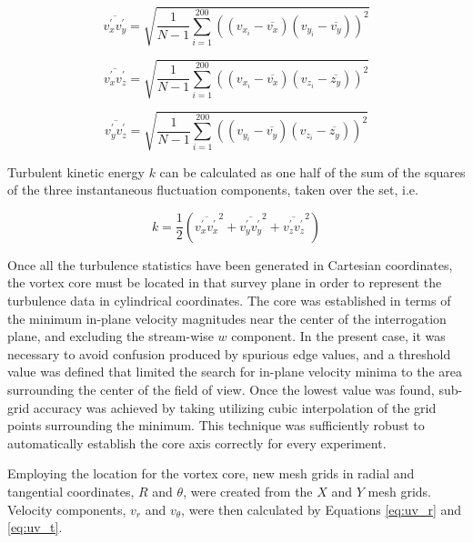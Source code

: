 \begin{equation}
\overline{v_x^\prime v_y^\prime} = \sqrt{\frac{1}{N-1} \sum_{i=1}^{200} 
	((v_{x_i} - \overline{v_x})(v_{y_i} - \overline{v_y}))^2}
\end{equation}

\begin{equation}
\overline{v_x^\prime v_z^\prime} = \sqrt{\frac{1}{N-1} \sum_{i=1}^{200} 
	((v_{x_i} - \overline{v_x})(v_{z_i} - \overline{z_y}))^2}
\end{equation}

\begin{equation}
\overline{v_y^\prime v_z^\prime} = \sqrt{\frac{1}{N-1} \sum_{i=1}^{200} 
	((v_{y_i} - \overline{v_y})(v_{z_i} - \overline{z_y}))^2}
\label{eq:rs_vw}
\end{equation}

Turbulent kinetic energy $k$ can be calculated as one half of the sum of the 
squares of the three instantaneous fluctuation components, taken over the set, 
i.e.

\begin{equation}
k = \frac{1}{2} \left(\overline{v_x^\prime v_x^\prime}^2 + 
	\overline{v_y^\prime v_y^\prime}^2 + 
	\overline{v_z^\prime v_z^\prime}^2\right)
\label{eq:tke}
\end{equation}


Once all the turbulence statistics have been 
generated in Cartesian coordinates, the 
vortex core must be located in that survey plane in order to represent the 
turbulence data in cylindrical coordinates. The core was established in terms 
of the minimum in-plane velocity magnitudes near the center of the 
interrogation plane, and excluding the stream-wise $w$ component. In the 
present case, it was necessary to avoid confusion produced by spurious edge 
values, and a threshold value was defined that limited the search for in-plane 
velocity minima to the area surrounding the center of the field of view. Once 
the lowest value was found, sub-grid accuracy was 
achieved by taking utilizing cubic interpolation of the grid points surrounding 
the minimum. This technique was sufficiently robust to automatically establish 
the core axis correctly for every experiment.

Employing the location for the vortex core, new mesh grids in radial and 
tangential coordinates, $R$ and $\theta$, were created from the $X$ and 
$Y$ mesh grids. Velocity components, $v_r$ and $v_\theta$, were then 
calculated by Equations \ref{eq:uv_r} and \ref{eq:uv_t}.

